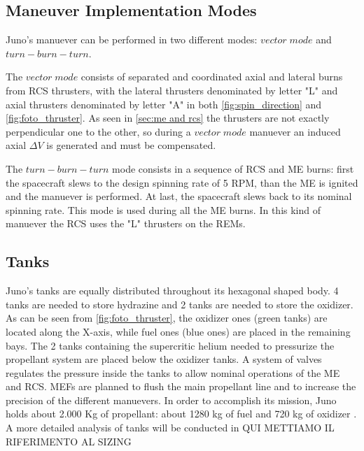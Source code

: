 \subsection{Maneuver Implementation Modes}
Juno's manuever can be performed in two different modes: $vector\;mode$ and $turn-burn-turn$.

The $vector\;mode$ consists of separated and coordinated axial and lateral burns from RCS thrusters, with the lateral thrusters denominated by letter "L" and axial thrusters denominated by letter "A" in both \autoref{fig:spin_direction} and \autoref{fig:foto_thruster}. As seen in \autoref{sec:me and rcs} the thrusters are not exactly perpendicular one to the other, so during a $vector\;mode$ manuever an induced axial $\Delta V$ is generated and must be compensated.


The $turn-burn-turn$ mode consists in a sequence of RCS and ME burns: first the spacecraft slews to the design spinning rate of 5 RPM, than the ME is ignited and the manuever is performed. At last, the spacecraft slews back to its nominal spinning rate. This mode is used during all the ME burns. In this kind of manuever the RCS uses the "L" thrusters on the REMs. 

\subsection{Tanks}

Juno's tanks are equally distributed throughout its hexagonal shaped body. 4 tanks are needed to store hydrazine and 2 tanks are needed to store the oxidizer. As can be seen from \autoref{fig:foto_thruster}, the oxidizer ones (green tanks) are located along the X-axis, while fuel ones (blue ones) are placed in the remaining bays. The 2 tanks containing the supercritic helium needed to pressurize the propellant system are placed below the oxidizer tanks. A system of valves regulates the pressure inside the tanks to allow nominal operations of the ME and RCS. MEFs are planned to flush the main propellant line and to increase the precision of the different manuevers. 
In order to accomplish its mission, Juno holds about 2.000 Kg of propellant: about 1280 kg of fuel and 720 kg of oxidizer \cite{junno_inner}. A more detailed analysis of tanks will be conducted in QUI METTIAMO IL RIFERIMENTO AL SIZING
 











